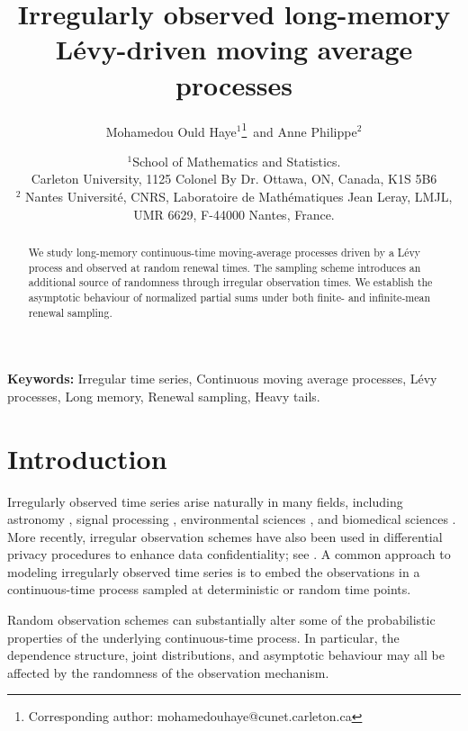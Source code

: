 \documentclass[preprint,12pt]{article}
\title{Irregularly observed long-memory L\'evy-driven moving average processes}
\author{
Mohamedou Ould Haye$^1$\footnote{Corresponding author: mohamedouhaye@cunet.carleton.ca}
\,and Anne Philippe$^2$
}
\date{
$^1$\small School of Mathematics and Statistics.\\
Carleton University, 1125 Colonel By Dr. Ottawa, ON, Canada, K1S 5B6\\
$^2$ Nantes Universit\'e, CNRS, Laboratoire de Math\'ematiques Jean Leray, LMJL,
UMR 6629, F-44000 Nantes, France.
}
\begin{document}
\maketitle

\begin{abstract}
We study long-memory continuous-time moving-average processes driven by a L\'evy process and observed at random renewal times. The sampling scheme introduces an additional source of randomness through irregular observation times. We establish the asymptotic behaviour of normalized partial sums under both finite- and infinite-mean renewal sampling. 
\end{abstract}

\textbf{Keywords:} Irregular time series, Continuous moving average processes, L\'evy processes, Long memory, Renewal sampling, Heavy tails.
\section{Introduction}\label{Introduction}

Irregularly observed time series arise naturally in many fields, including astronomy \cite{10.1093rastirzac011}, signal processing \cite{SUN2024110075}, environmental sciences \cite{Beelaerts2010TimeSeriesRF}, and biomedical sciences \cite{Shukla2018ModelingIS}. More recently, irregular observation schemes have also been used in differential privacy procedures to enhance data confidentiality; see \cite{pmlr-v151-koga22a}. A common approach to modeling irregularly observed time series is to embed the observations in a continuous-time process sampled at deterministic or random time points.

Random observation schemes can substantially alter some of the probabilistic properties of the underlying continuous-time process. In particular, the dependence structure, joint distributions, and asymptotic behaviour may all be affected by the randomness of the observation mechanism.
\end{document}
